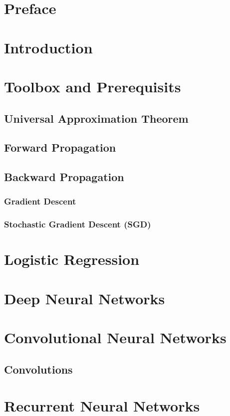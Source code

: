 \documentclass[a4paper,10pt]{book}
\begin{document}

\chapter*{Preface}

\chapter{Introduction}

\chapter{Toolbox and Prerequisits}

\section{Universal Approximation Theorem}

\section{Forward Propagation}

\section{Backward Propagation}

\subsection{Gradient Descent}

\subsection{Stochastic Gradient Descent (SGD)}

\chapter{Logistic Regression}

\chapter{Deep Neural Networks}

\chapter{Convolutional Neural Networks}

\section{Convolutions}

\chapter{Recurrent Neural Networks}
\end{document}

